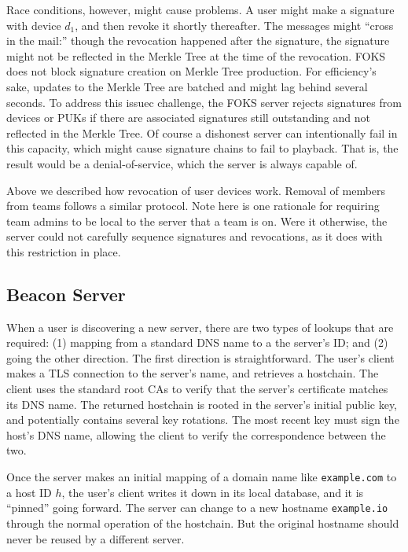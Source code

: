Race conditions, however, might cause problems. A user might make a signature
with device $d_1$, and then revoke it shortly thereafter. The messages might
``cross in the mail:'' though the revocation happened after the signature, the
signature might not be reflected in the Merkle Tree at the time of the
revocation. FOKS does not block signature creation on Merkle Tree production.
For efficiency's sake, updates to the Merkle Tree are batched and might lag
behind several seconds. To address this issuec challenge, the FOKS server
rejects signatures from devices or PUKs if there are associated signatures still
outstanding and not reflected in the Merkle Tree. Of course a dishonest server
can intentionally fail in this capacity, which might cause signature chains to
fail to playback. That is, the result would be a denial-of-service, which the
server is always capable of.

Above we described how revocation of user devices work. Removal of members from 
teams follows a similar protocol.  Note here is one rationale for requiring team
admins to be local to the server that a team is on. Were it otherwise, the
server could not carefully sequence signatures and revocations, as it does with
this restriction in place.

\subsection{Beacon Server}
\label{sec:beacon}

When a user is discovering a new server, there are two types of lookups that are
required: (1) mapping from a standard DNS name to a the server's ID; and (2)
going the other direction. The first direction is straightforward.  The user's
client makes a TLS connection to the server's name, and retrieves a hostchain.
The client uses the standard root CAs to verify that the server's certificate 
matches its DNS name. The returned hostchain is rooted in the server's
initial public key, and potentially contains several key rotations. The most
recent key must sign the host's DNS name, allowing the client to verify the
correspondence between the two. 

Once the server makes an initial mapping of a domain name like
\texttt{example.com} to a host ID $h$, the user's client writes it down in its
local database, and it is ``pinned'' going forward. The server can change to a
new hostname \texttt{example.io} through the normal operation of the
hostchain. But the original hostname should never be reused by a different
server.

